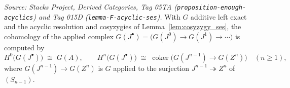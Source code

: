 \begin{lemma}
  \label{lem:cohomology_of_applied_resolution}
  \textit{Source: Stacks Project, Derived Categories, Tag 05TA
  (\texttt{proposition-enough-acyclics}) and Tag 015D
  (\texttt{lemma-F-acyclic-ses}).}
  With \(G\) additive left exact and the acyclic resolution and cosyzygies of
  Lemma~\ref{lem:cosyzygy_ses}, the cohomology of the applied complex
  \(G(J^\bullet) = \bigl(G(J^0) \to G(J^1) \to \cdots\bigr)\) is computed by
  \[
    H^0\bigl(G(J^\bullet)\bigr) \;\cong\; G(A),
    \qquad
    H^n\bigl(G(J^\bullet)\bigr) \;\cong\;
      \operatorname{coker}\bigl(G(J^{n-1}) \to G(Z^n)\bigr) \quad (n \geq 1),
  \]
  where \(G(J^{n-1}) \to G(Z^n)\) is \(G\) applied to the surjection
  \(J^{n-1} \twoheadrightarrow Z^n\) of \((S_{n-1})\).
\end{lemma}

